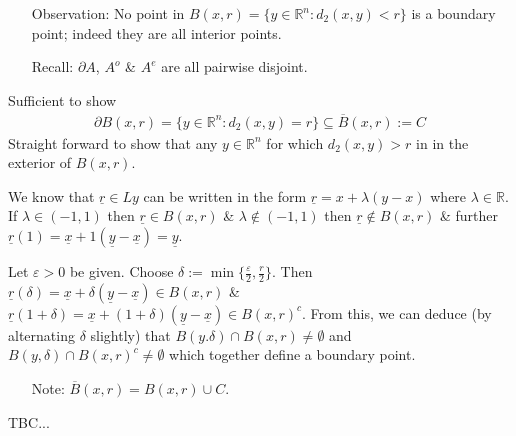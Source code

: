 \documentclass[10pt]{article}
\begin{document}
\begin{multicols}{2}

    \begin{itemize}
        \item[Observation:] No point in $B(x,r)=\{y\in\mathbb{R}^{n}:d_{2}(x,y)<r\}$ is a boundary point; indeed they are all interior points.
        \item[Recall:] $\partial A$, $A^{o}$ \& $A^{e}$ are all pairwise disjoint.
        
    \end{itemize}
    Sufficient to show
        \begin{align*}
            \boxed{\partial B(x,r)=\{y\in\mathbb{R}^{n}:d_{2}(x,y)=r\}\subseteq \overline{B}(x,r):=C}
        \end{align*}
    Straight forward to show that any $y\in\mathbb{R}^{n}$ for which $d_{2}(x,y)>r$ in in the exterior of $B(x,r)$.
\end{multicols}
We know that $\underline{r}\in Ly$ can be written in the form $\underline{r}=x+\lambda(y-x)$ where $\lambda\in\mathbb{R}$. If $\lambda\in(-1,1)$ then $\underline{r}\in B(x,r)$ \& $\lambda\notin(-1,1)$ then $\underline{r}\notin B(x,r)$ \& further $\underline{r}(1)=\underline{x}+1(\underline{y}-\underline{x})=\underline{y}$.

Let $\varepsilon>0$ be given. Choose $\delta:=\min\{\frac{\varepsilon}{2},\frac{r}{2}\}$. Then $\underline{r}(\delta)=\underline{x}+\delta(\underline{y}-\underline{x})\in B(x,r)$ \& $\underline{r}(1+\delta)=\underline{x}+(1+\delta)(\underline{y}-\underline{x})\in B(x,r)^{c}$. From this, we can deduce (by alternating $\delta$ slightly) that $B(y.\delta)\cap B(x,r)\neq\emptyset$ and $B(y,\delta)\cap B(x,r)^{c}\neq\emptyset$ which together define a boundary point.
\begin{itemize}
    \item[Note:] $\boxed{\overline{B}(x,r)=B(x,r)\cup C.}$ 
\end{itemize}


TBC...
\end{document}
